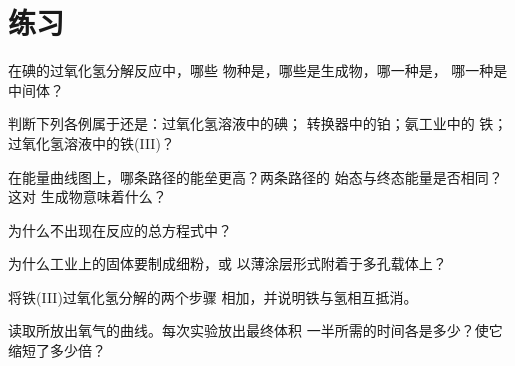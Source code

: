 \section{练习}


\begin{exercise}[$\star$]\label{exo:g12:catalysis:1}
在碘的过氧化氢分解反应中，哪些
物种是，哪些是生成物，哪一种是，
哪一种是中间体？
\end{exercise}

\begin{exercise}[$\star$]\label{exo:g12:catalysis:2}
判断下列各例属于还是：过氧化氢溶液中的碘；
转换器中的铂；氨工业中的
铁；过氧化氢溶液中的铁(III)？
\end{exercise}

\begin{exercise}[$\star$]\label{exo:g12:catalysis:3}
在能量曲线图上，哪条路径的能垒更高？两条路径的
始态与终态能量是否相同？这对
生成物意味着什么？
\end{exercise}

\begin{exercise}[$\star$]\label{exo:g12:catalysis:4}
为什么不出现在反应的总方程式中？
\end{exercise}

\begin{exercise}[$\star$]\label{exo:g12:catalysis:5}
为什么工业上的固体要制成细粉，或
以薄涂层形式附着于多孔载体上？
\end{exercise}

\begin{exercise}[$\star\star$]\label{exo:g12:catalysis:6}
将铁(III)过氧化氢分解的两个步骤
相加，并说明铁与氢相互抵消。
\end{exercise}

\begin{exercise}[$\star\star$]\label{exo:g12:catalysis:7}
读取所放出氧气的曲线。每次实验放出最终体积
一半所需的时间各是多少？使它
缩短了多少倍？
\end{exercise}

